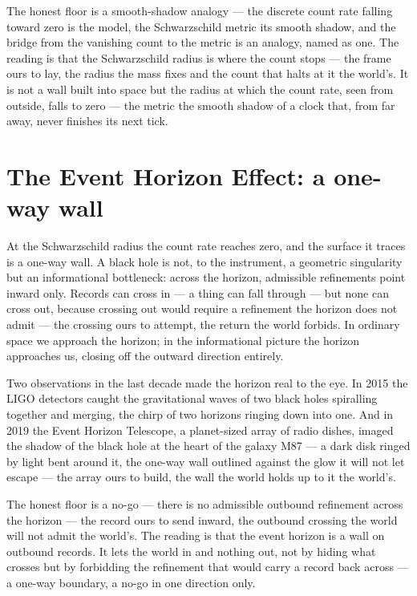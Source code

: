 The honest floor is a smooth-shadow analogy --- the discrete count rate falling toward zero is the model, the
Schwarzschild metric its smooth shadow, and the bridge from the vanishing count to the metric is an analogy,
named as one. The reading is that the Schwarzschild radius is where the count stops --- the frame ours to lay,
the radius the mass fixes and the count that halts at it the world's. It is not a wall built into space but the
radius at which the count rate, seen from outside, falls to zero --- the metric the smooth
shadow of a clock that, from far away, never finishes its next tick.

\section{The Event Horizon Effect: a one-way wall}
\label{se:event-horizon}

At the Schwarzschild radius the count rate reaches zero, and the surface it traces is a one-way wall. A black
hole is not, to the instrument, a geometric singularity but an informational bottleneck: across the horizon,
admissible refinements point inward only. Records can cross in --- a thing can fall through --- but none can
cross out, because crossing out would require a refinement the horizon does not admit --- the crossing ours to
attempt, the return the world forbids. In ordinary space we approach the horizon; in the informational picture
the horizon approaches us, closing off the outward direction entirely.

Two observations in the last decade made the horizon real to the eye. In 2015 the LIGO detectors caught the
gravitational waves of two black holes spiralling together and merging, the chirp of two horizons ringing down
into one. And in 2019 the Event Horizon Telescope, a planet-sized array of radio dishes, imaged the shadow of
the black hole at the heart of the galaxy M87 --- a dark disk ringed by light bent around it, the one-way wall
outlined against the glow it will not let escape --- the array ours to build, the wall the world holds up to it
the world's.

The honest floor is a no-go --- there is no admissible outbound refinement across the horizon --- the record
ours to send inward, the outbound crossing the world will not admit the world's. The reading is that the event
horizon is a wall on outbound records. It lets the world in and nothing out, not by hiding what
crosses but by forbidding the refinement that would carry a record back across --- a one-way boundary, a no-go
in one direction only.

